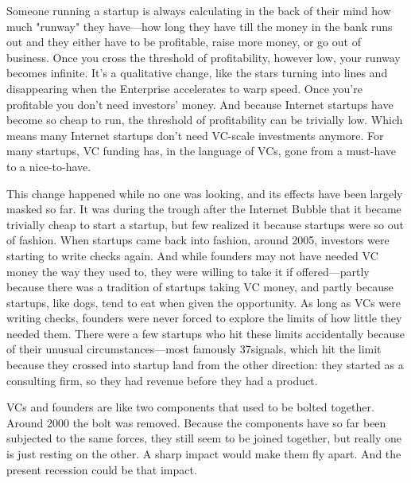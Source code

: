 Someone
                  running a startup is always calculating in the back of their
                  mind how much "runway" they have---how long they have till
                  the money in the bank runs out and they either have to be
                  profitable, raise more money, or go out of business. Once you
                  cross the threshold of profitability, however low, your runway
                  becomes infinite. It's a qualitative change, like the stars
                  turning into lines and disappearing when the Enterprise
                  accelerates to warp speed. Once you're profitable you don't
                  need investors' money. And because Internet startups have
                  become so cheap to run, the threshold of profitability can be
                  trivially low. Which means many Internet startups don't need
                  VC-scale investments anymore. For many startups, VC funding
                  has, in the language of VCs, gone from a must-have to a
                  nice-to-have.

This change happened while no one was
                  looking, and its effects have been largely masked so far. It
                  was during the trough after the Internet Bubble that it became
                  trivially cheap to start a startup, but few realized it
                  because startups were so out of fashion. When startups came
                  back into fashion, around 2005, investors were starting to
                  write checks again. And while founders may not have needed VC
                  money the way they used to, they were willing to take it if
                  offered---partly because there was a tradition of startups
                  taking VC money, and partly because startups, like dogs, tend
                  to eat when given the opportunity. As long as VCs were writing
                  checks, founders were never forced to explore the limits of
                  how little they needed them. There were a few startups who hit
                  these limits accidentally because of their unusual
                  circumstances---most famously 37signals, which hit the
                  limit because they crossed into startup land from the other
                  direction: they started as a consulting firm, so they had
                  revenue before they had a product.

VCs and founders
                  are like two components that used to be bolted together.
                  Around 2000 the bolt was removed. Because the components have
                  so far been subjected to the same forces, they still seem to
                  be joined together, but really one is just resting on the
                  other. A sharp impact would make them fly apart. And the
                  present recession could be that impact.

